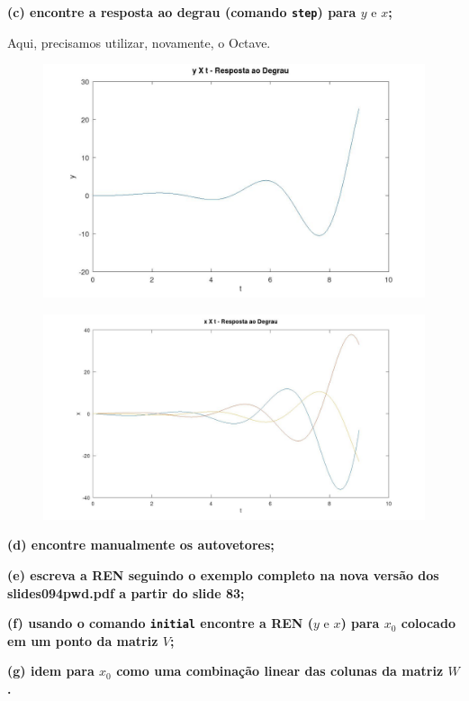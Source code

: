\documentclass[11pt]{article}
\begin{document}
\textbf{(c) encontre a resposta ao degrau (comando \texttt{step}) para $y \text{ e } x$;}

Aqui, precisamos utilizar, novamente, o Octave.

\begin{figure}[h]
  \includegraphics[scale=0.3]{plot1c1.jpg}
  \centering
\end{figure}
\begin{figure}[h]
  \includegraphics[scale=0.25]{plot1c2.jpg}
  \centering
\end{figure}

\textbf{(d) encontre manualmente os autovetores;}

\textbf{(e) escreva a REN seguindo o exemplo completo na nova versão dos slides094pwd.pdf a partir do slide 83;}

\textbf{(f) usando o comando \texttt{initial} encontre a REN ($y \text{ e } x$) para $x_0$ colocado em um ponto da matriz $V$;}

\textbf{(g) idem para $x_0$ como uma combinação linear das colunas da matriz $W$.}


\vspace{\baselineskip}
\end{document}
